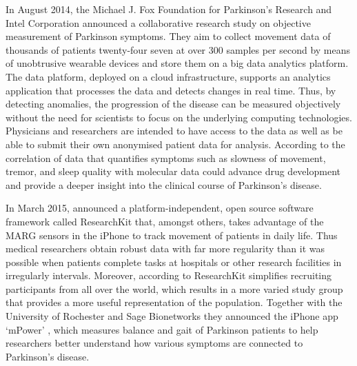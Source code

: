 In August 2014, the Michael J. Fox Foundation for Parkinson’s Research and Intel Corporation \cite{Intel_2013} announced a collaborative research study on objective measurement of Parkinson symptoms. They aim to collect movement data of thousands of patients twenty-four seven at over 300 samples per second by means of unobtrusive wearable devices and store them on a big data analytics platform. The data platform, deployed on a cloud infrastructure, supports an analytics application that processes the data and detects changes in real time. Thus, by detecting anomalies, the progression of the disease can be measured objectively without the need for scientists to focus on the underlying computing technologies. Physicians and researchers are intended to have access to the data as well as be able to submit their own anonymised patient data for analysis. According to \cite{Intel_2013} the correlation of data that quantifies symptoms such as slowness of movement, tremor, and sleep quality with molecular data could advance drug development and provide a deeper insight into the clinical course of Parkinson's disease.

In March 2015, \citeauthor{Apple_2015} announced a platform-independent, open source software framework called ResearchKit \cite{Apple_2015} that, amongst others, takes advantage of the MARG sensors in the iPhone to track movement of patients in daily life. Thus medical researchers obtain robust data with far more regularity than it was possible when patients complete tasks at hospitals or other research facilities in irregularly intervals. Moreover, according to \citeauthor{Apple_2015} ResearchKit simplifies recruiting participants from all over the world, which results in a more varied study group that provides a more useful representation of the population. Together with the University of Rochester and Sage Bionetworks they announced the iPhone app `mPower' \cite{mpower}, which measures balance and gait of Parkinson patients to help researchers better understand how various symptoms are connected to Parkinson's disease.

